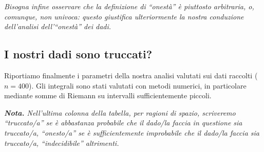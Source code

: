 \documentclass{article}
\begin{document}
\begin{appendices}
\emph{Bisogna infine osservare che la definizione di “onestà” è piuttosto
arbitraria, o, comunque, non univoca: questo giustifica ulteriormente la
nostra conduzione dell'analisi dell'“onestà” dei dadi.}

\subsection{I nostri dadi sono truccati?}
Riportiamo finalmente i parametri della nostra analisi valutati sui dati raccolti
($n = 400$).
Gli integrali sono stati valutati con metodi numerici, in particolare mediante
somme di Riemann su intervalli sufficientemente piccoli.

\emph{\textbf{Nota.}
    Nell'ultima colonna della tabella, per ragioni di spazio,
    scriveremo
    “truccato/a” se è abbastanza probabile che
    il dado/la faccia in questione sia truccato/a,
    “onesto/a” se è sufficientemente improbabile
    che il dado/la faccia sia truccato/a,
    “indecidibile” altrimenti.
}



\end{appendices}
\end{document}
